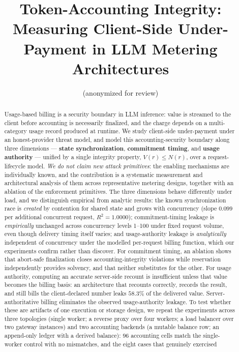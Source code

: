 \documentclass[11pt]{article}
\title{Token-Accounting Integrity:\\
Measuring Client-Side Under-Payment in LLM Metering Architectures}
\author{(anonymized for review)}
\date{}
\begin{document}
\maketitle

\begin{abstract}
Usage-based billing is a security boundary in LLM inference: value is streamed to the
client before accounting is necessarily finalized, and the charge depends on a
multi-category usage record produced at runtime. We study client-side under-payment
under an honest-provider threat model, and model this accounting-security boundary along
three dimensions --- \textbf{state synchronization}, \textbf{commitment timing}, and
\textbf{usage authority} --- unified by a single integrity property, $V(r)\le N(r)$, over
a request-lifecycle model. \emph{We do not claim new attack primitives}: the enabling
mechanisms are individually known, and the contribution is a systematic measurement and
architectural analysis of them across representative metering designs, together with an
ablation of the enforcement primitives. The three dimensions behave differently under
load, and we distinguish empirical from analytic results: the known synchronization race
is \emph{created} by contention for shared state and grows with concurrency (slope
$0.099$ per additional concurrent request, $R^2=1.0000$); commitment-timing leakage is
\emph{empirically} unchanged across concurrency levels 1--100 under fixed request volume,
even though delivery timing itself varies; and usage-authority leakage is
\emph{analytically} independent of concurrency under the modelled per-request billing
function, which our experiments confirm rather than discover. For commitment timing, an
ablation shows that abort-safe finalization closes accounting-integrity violations while
reservation independently provides solvency, and that neither substitutes for the other.
For usage authority, computing an accurate server-side recount is insufficient unless
that value becomes the billing basis: an architecture that recounts correctly, records
the result, and still bills the client-declared number leaks $58.3\%$ of the delivered
value. Server-authoritative billing eliminates the observed usage-authority leakage. To
test whether these are artifacts of one execution or storage design, we repeat the
experiments across three topologies (single worker; a reverse proxy over four workers; a
load balancer over two gateway instances) and two accounting backends (a mutable balance
row; an append-only ledger with a derived balance): $96$ accounting cells match the
single-worker control with no mismatches, and the eight cases that genuinely exercised

\end{abstract}
\end{document}
